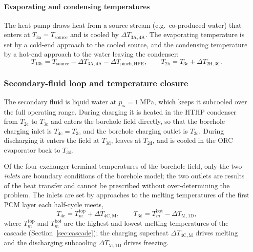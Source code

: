 \paragraph{Evaporating and condensing temperatures}
The heat pump draws heat from a source stream (e.g.\ co-produced water) that
enters at $T_\mathrm{3a}=T_\mathrm{source}$ and is cooled by
$\Delta T_\mathrm{3A,4A}$. The evaporating temperature is set by a cold-end
approach to the cooled source, and the condensing temperature by a hot-end
approach to the water leaving the condenser:
\begin{equation}
  T_\mathrm{13h}=T_\mathrm{source}-\Delta T_\mathrm{3A,4A}-\Delta T_\mathrm{pinch,HPE},
  \qquad
  T_\mathrm{2h}=T_\mathrm{3c}+\Delta T_\mathrm{2H,3C}.
  \label{eq:hp-T}
\end{equation}

\subsubsection{Secondary-fluid loop and temperature closure}
\label{sec:closure-T}

The secondary fluid is liquid water at $p_\mathrm{w}=\SI{1}{\mega\pascal}$,
which keeps it subcooled over the full operating range. During charging it is
heated in the HTHP condenser from $T_\mathrm{2c}$ to $T_\mathrm{3c}$ and
enters the borehole field directly, so that the borehole charging inlet is
$T_\mathrm{4c}=T_\mathrm{3c}$ and the borehole charging outlet is
$T_\mathrm{2c}$. During discharging it enters the field at $T_\mathrm{3d}$,
leaves at $T_\mathrm{2d}$, and is cooled in the ORC evaporator back to
$T_\mathrm{3d}$.

Of the four exchanger terminal temperatures of the borehole field, only the
two \emph{inlets} are boundary conditions of the borehole model; the two
outlets are results of the heat transfer and cannot be prescribed without
over-determining the problem. The inlets are set by approaches to the
melting temperatures of the first PCM layer each half-cycle meets,
\begin{equation}
  T_\mathrm{4c}=T_{m}^\mathrm{top}+\Delta T_\mathrm{4C,M},
  \qquad
  T_\mathrm{3d}=T_{m}^\mathrm{bot}-\Delta T_\mathrm{M,1D},
  \label{eq:inlets}
\end{equation}
where $T_{m}^\mathrm{top}$ and $T_{m}^\mathrm{bot}$ are the highest and lowest
melting temperatures of the cascade (Section~\ref{sec:cascade}); the charging
superheat $\Delta T_\mathrm{4C,M}$ drives melting and the discharging
subcooling $\Delta T_\mathrm{M,1D}$ drives freezing.


